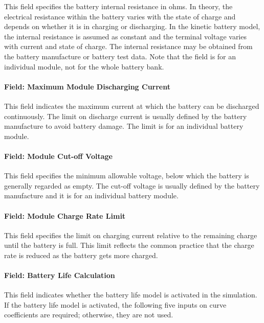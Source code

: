 This field specifies the battery internal resistance in ohms. In theory, the electrical resistance within the battery varies with the state of charge and depends on whether it is in charging or discharging. In the kinetic battery model, the internal resistance is assumed as constant and the terminal voltage varies with current and state of charge. The internal resistance may be obtained from the battery manufacture or battery test data. Note that the field is for an individual module, not for the whole battery bank.

\paragraph{Field: Maximum Module Discharging Current}\label{field-maximum-module-discharging-current}

This field indicates the maximum current at which the battery can be discharged continuously. The limit on discharge current is usually defined by the battery manufacture to avoid battery damage. The limit is for an individual battery module.

\paragraph{Field: Module Cut-off Voltage}\label{field-module-cut-off-voltage}

This field specifies the minimum allowable voltage, below which the battery is generally regarded as empty. The cut-off voltage is usually defined by the battery manufacture and it is for an individual battery module.

\paragraph{Field: Module Charge Rate Limit}\label{field-module-charge-rate-limit}

This field specifies the limit on charging current relative to the remaining charge until the battery is full. This limit reflects the common practice that the charge rate is reduced as the battery gets more charged.

\paragraph{Field: Battery Life Calculation}\label{field-battery-life-calculation}

This field indicates whether the battery life model is activated in the simulation. If the battery life model is activated, the following five inputs on curve coefficients are required; otherwise, they are not used.

